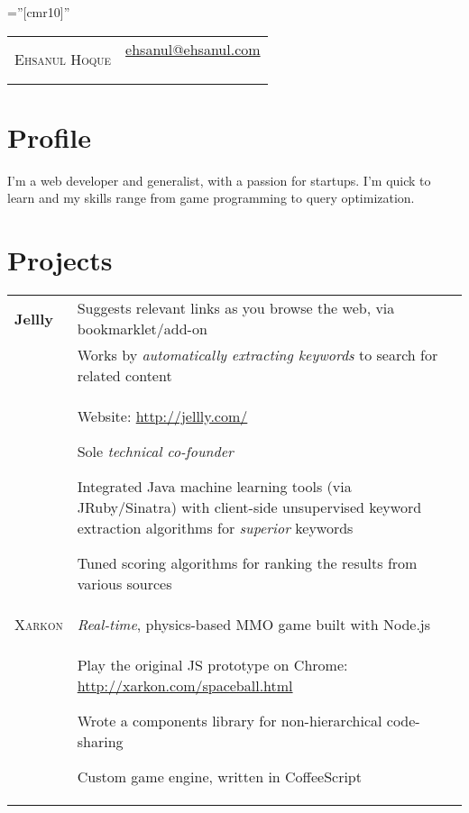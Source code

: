 \documentclass[a4paper,10pt]{article}
\newenvironment{packed-list}{
  \vspace{2pt}
  \begin{itemize}[itemsep=1pt,partopsep=0pt,leftmargin=1.5em]
    \setlength{\parskip}{0pt}
    \setlength{\partopsep}{9pt}
    \setlength{\parsep}{0pt}
    \setlength{\topsep}{0pt}
} {\end{itemize}}
\begin{document}
\pagestyle{empty} %

\font\fb=''[cmr10]'' %

\begin{tabular*}{\textwidth}{@{\extracolsep{\fill}} lr}
      {\color{Gray!50!black}\Huge \textsc{Ehsanul Hoque}}
      & \pbox{20cm}{
          {\large \href{mailto:ehsanul@ehsanul.com}{ehsanul@ehsanul.com}}\\
          \hspace*{\fill}{\large (347) 679 9621}\\
        }\\
\end{tabular*}

\section{Profile}
{\fontsize{12}{14}\selectfont  
  I'm a web developer and generalist, with a passion for startups.
  I'm quick to learn and my skills range from game programming
  to query optimization.  }


\section{Projects}
\begin{tabular}{p{}p{}}
  \hfill \textbf{Jellly}
    & Suggests relevant links as you browse the web, via bookmarklet/add-on\\
    &  Works by \emph{automatically extracting keywords} to search for related content\\
    & Website: \href{http://jellly.com/}{http://jellly.com/} 
    \begin{packed-list}
      \item{ Sole \emph{technical co-founder} }
      \item{ Integrated Java machine learning tools (via JRuby/Sinatra) with client-side unsupervised keyword extraction algorithms for \emph{superior} keywords}
      \item{ Tuned scoring algorithms for ranking the results from various sources }
    \end{packed-list}
    \vspace{-5pt}
    \\
  \hfill \textsc{Xarkon}
    & \emph{Real-time}, physics-based MMO game built with Node.js\\
    & Play the original JS prototype on Chrome:
           \href{http://xarkon.com/spaceball.html}{http://xarkon.com/spaceball.html}
    \begin{packed-list}
      \item{ Wrote a components library for non-hierarchical code-sharing }
      \item{ Custom game engine, written in CoffeeScript }
    \end{packed-list}
    \\
\end{tabular}
\vspace{-25pt}
\end{document}
